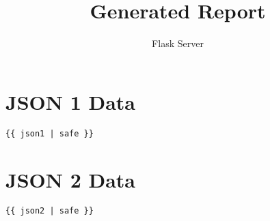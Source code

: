 \documentclass{article}
\title{Generated Report}
\author{Flask Server}
\begin{document}
\maketitle

\section*{JSON 1 Data}
\begin{verbatim}
{{ json1 | safe }}
\end{verbatim}

\section*{JSON 2 Data}
\begin{verbatim}
{{ json2 | safe }}
\end{verbatim}
\end{document}
